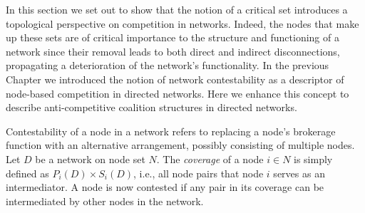 In this section we set out to show that the notion of a critical set introduces a topological perspective on competition in networks. Indeed, the nodes that make up these sets are of critical importance to the structure and functioning of a network since their removal leads to both direct and indirect disconnections, propagating a deterioration of the network's functionality. In the previous Chapter we introduced the notion of network contestability as a descriptor of node-based competition in directed networks. Here we enhance this concept to describe anti-competitive coalition structures in directed networks.

Contestability of a node in a network refers to replacing a node's brokerage function with an alternative arrangement, possibly consisting of multiple nodes. Let $D$ be a network on node set $N$. The \emph{coverage} of a node $i \in N$ is simply defined as $P_{i}(D) \times S_{i}(D)$, i.e., all node pairs that node $i$ serves as an intermediator. A node is now contested if any pair in its coverage can be intermediated by other nodes in the network.

